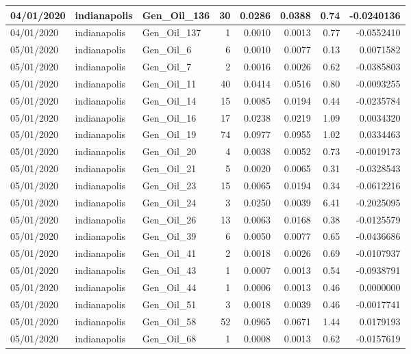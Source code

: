 \documentclass[
  letterpaper,
  DIV=11,
  numbers=noendperiod]{scrartcl}
\begin{document}
\begin{tabular}{l|l|l|r|r|r|r|r}
\hline
04/01/2020 & indianapolis & Gen\_Oil\_136 & 30 & 0.0286 & 0.0388 & 0.74 & -0.0240136\\
\hline
04/01/2020 & indianapolis & Gen\_Oil\_137 & 1 & 0.0010 & 0.0013 & 0.77 & -0.0552410\\
\hline
05/01/2020 & indianapolis & Gen\_Oil\_6 & 6 & 0.0010 & 0.0077 & 0.13 & 0.0071582\\
\hline
05/01/2020 & indianapolis & Gen\_Oil\_7 & 2 & 0.0016 & 0.0026 & 0.62 & -0.0385803\\
\hline
05/01/2020 & indianapolis & Gen\_Oil\_11 & 40 & 0.0414 & 0.0516 & 0.80 & -0.0093255\\
\hline
05/01/2020 & indianapolis & Gen\_Oil\_14 & 15 & 0.0085 & 0.0194 & 0.44 & -0.0235784\\
\hline
05/01/2020 & indianapolis & Gen\_Oil\_16 & 17 & 0.0238 & 0.0219 & 1.09 & 0.0034320\\
\hline
05/01/2020 & indianapolis & Gen\_Oil\_19 & 74 & 0.0977 & 0.0955 & 1.02 & 0.0334463\\
\hline
05/01/2020 & indianapolis & Gen\_Oil\_20 & 4 & 0.0038 & 0.0052 & 0.73 & -0.0019173\\
\hline
05/01/2020 & indianapolis & Gen\_Oil\_21 & 5 & 0.0020 & 0.0065 & 0.31 & -0.0328543\\
\hline
05/01/2020 & indianapolis & Gen\_Oil\_23 & 15 & 0.0065 & 0.0194 & 0.34 & -0.0612216\\
\hline
05/01/2020 & indianapolis & Gen\_Oil\_24 & 3 & 0.0250 & 0.0039 & 6.41 & -0.2025095\\
\hline
05/01/2020 & indianapolis & Gen\_Oil\_26 & 13 & 0.0063 & 0.0168 & 0.38 & -0.0125579\\
\hline
05/01/2020 & indianapolis & Gen\_Oil\_39 & 6 & 0.0050 & 0.0077 & 0.65 & -0.0436686\\
\hline
05/01/2020 & indianapolis & Gen\_Oil\_41 & 2 & 0.0018 & 0.0026 & 0.69 & -0.0107937\\
\hline
05/01/2020 & indianapolis & Gen\_Oil\_43 & 1 & 0.0007 & 0.0013 & 0.54 & -0.0938791\\
\hline
05/01/2020 & indianapolis & Gen\_Oil\_44 & 1 & 0.0006 & 0.0013 & 0.46 & 0.0000000\\
\hline
05/01/2020 & indianapolis & Gen\_Oil\_51 & 3 & 0.0018 & 0.0039 & 0.46 & -0.0017741\\
\hline
05/01/2020 & indianapolis & Gen\_Oil\_58 & 52 & 0.0965 & 0.0671 & 1.44 & 0.0179193\\
\hline
05/01/2020 & indianapolis & Gen\_Oil\_68 & 1 & 0.0008 & 0.0013 & 0.62 & -0.0157619\\

\end{tabular}
\end{document}
